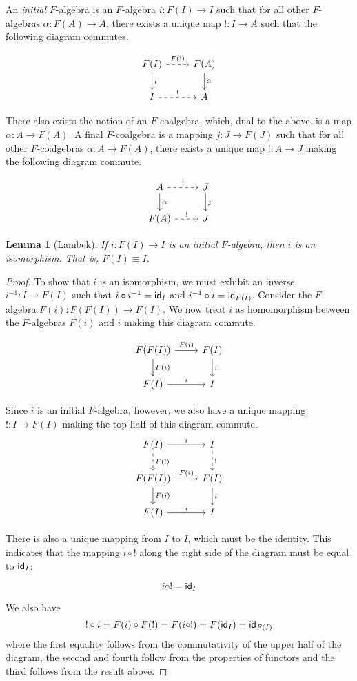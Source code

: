 \documentclass[11pt]{article}
\newcommand*{\comp}{\circ}
\newtheorem{lemma}{Lemma}
\begin{document}
An {\em initial} $F$-algebra is an $F$-algebra $i: F(I) \to I$ such that
for all other $F$-algebras $\alpha: F(A) \to A$, there exists a unique map
$!: I \to A$ such that the following diagram commutes.

\[
\begin{tikzcd}
F(I) \arrow{d}{i} \arrow[dashed]{r}{F(!)} & F(A) \arrow{d}{\alpha}\\
I \arrow[dashed]{r}{!} & A
\end{tikzcd}
\]

There also exists the notion of an $F$-coalgebra, which, dual to the above,
is a map $\alpha: A \to F(A)$. A final $F$-coalgebra is a mapping 
$j: J \to F(J)$ such that for all other $F$-coalgebras $\alpha: A \to F(A)$,
there exists a unique map $!: A \to J$ making the following diagram commute.

\[
\begin{tikzcd}
A \arrow{d}{\alpha} \arrow[dashed]{r}{!} & J \arrow{d}{j}\\
F(A) \arrow[dashed]{r}{!} & J
\end{tikzcd}
\]

\begin{lemma}[Lambek]
If $i: F(I) \to I$ is an initial $F$-algebra, then $i$ is an isomorphism.
That is, $F(I) \equiv I$.
\end{lemma}

\begin{proof}
To show that $i$ is an isomorphism, we must exhibit an inverse
$i^{-1}: I \to F(I)$
such that $i \comp i^{-1} = \id_I$ and $i^{-1} \comp i = \id_{F(I)}$.
Consider the $F$-algebra $F(i): F(F(I)) \to F(I)$. We now treat $i$ as
homomorphism between the $F$-algebras $F(i)$ and $i$ making this diagram
commute.

\[
\begin{tikzcd}
F(F(I)) \arrow{d}{F(i)} \arrow{r}{F(i)} & F(I) \arrow{d}{i}\\
F(I) \arrow{r}{i} & I
\end{tikzcd}
\]

Since $i$ is an initial $F$-algebra, however, we also have a unique mapping
$!: I \to F(I)$ making the top half of this diagram commute.
\[
\begin{tikzcd}
F(I) \arrow[dashed]{d}{F(!)} \arrow{r}{i} & I \arrow[dashed]{d}{!}\\
F(F(I)) \arrow{d}{F(i)} \arrow{r}{F(i)} & F(I) \arrow{d}{i}\\
F(I) \arrow{r}{i} & I
\end{tikzcd}
\]

There is also a unique mapping from $I$ to $I$, which must be the identity.
This indicates that the mapping $i \comp !$ along the right side of the
diagram must be equal to $\textsf{id}_I$:

\[i \comp ! = \id_I\]

We also have
\[! \comp i = F(i) \comp F(!) = F(i \comp !) = F(\id_I) = \id_{F(I)}\]
where the first equality follows from the commutativity of the upper half of
the diagram, the second and fourth follow from the properties of functors
and the third follows from the result above.
\end{proof}
\end{document}
